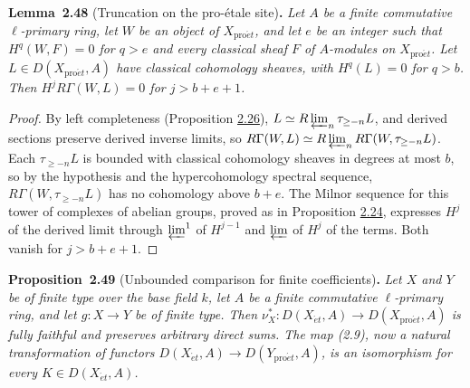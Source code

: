 \documentclass[11pt]{article}
\newenvironment{bpstatement}[2]{\par\addvspace{0.6\baselineskip}\noindent\textbf{#1}#2\textbf{.}\enspace\ignorespaces}
  {\par\addvspace{0.4\baselineskip}}
\newenvironment{bpstatementit}[2]{\begin{bpstatement}{#1}{#2}\itshape\ignorespaces}{\end{bpstatement}}
\begin{document}
\label{bp142}%
\begin{bpstatementit}{Lemma~2.48}{ (Truncation on the pro-étale site)}
Let \(A\) be a finite commutative \(\ell\)-primary ring, let \(W\) be an object of \(X_{\mathrm{pro}\acute{e}t}\), and let \(e\) be an integer such that \(H^q(W,F)=0\) for \(q>e\) and every classical sheaf \(F\) of \(A\)-modules on \(X_{\mathrm{pro}\acute{e}t}\). Let \(L\in D(X_{\mathrm{pro}\acute{e}t},A)\) have classical cohomology sheaves, with \(H^q(L)=0\) for \(q>b\). Then \(H^jR\Gamma(W,L)=0\) for \(j>b+e+1\).
\end{bpstatementit}

\begin{proof}[{Proof}]\label{bp143}%
By left completeness (Proposition \hyperref[bp75]{2.26}), \(L\simeq R\varprojlim_n\tau_{\geq-n}L\), and derived sections preserve derived inverse limits, so \(R\Gamma(W,L)\simeq R\varprojlim_nR\Gamma(W,\tau_{\geq-n}L)\). Each \(\tau_{\geq-n}L\) is bounded with classical cohomology sheaves in degrees at most \(b\), so by the hypothesis and the hypercohomology spectral sequence, \(R\Gamma(W,\tau_{\geq-n}L)\) has no cohomology above \(b+e\). The Milnor sequence for this tower of complexes of abelian groups, proved as in Proposition \hyperref[bp69]{2.24}, expresses \(H^j\) of the derived limit through \(\varprojlim^1\) of \(H^{j-1}\) and \(\varprojlim\) of \(H^j\) of the terms. Both vanish for \(j>b+e+1\).
\end{proof}

\label{bp144}%
\begin{bpstatementit}{Proposition~2.49}{ (Unbounded comparison for finite coefficients)}
Let \(X\) and \(Y\) be of finite type over the base field \(k\), let \(A\) be a finite commutative \(\ell\)-primary ring, and let \(g:X\to Y\) be of finite type. Then \(\nu_X^*:D(X_{\acute{e}t},A)\to D(X_{\mathrm{pro}\acute{e}t},A)\) is fully faithful and preserves arbitrary direct sums. The map (2.9), now a natural transformation of functors \(D(X_{\acute{e}t},A)\to D(Y_{\mathrm{pro}\acute{e}t},A)\), is an isomorphism for every \(K\in D(X_{\acute{e}t},A)\).
\end{bpstatementit}
\end{document}
